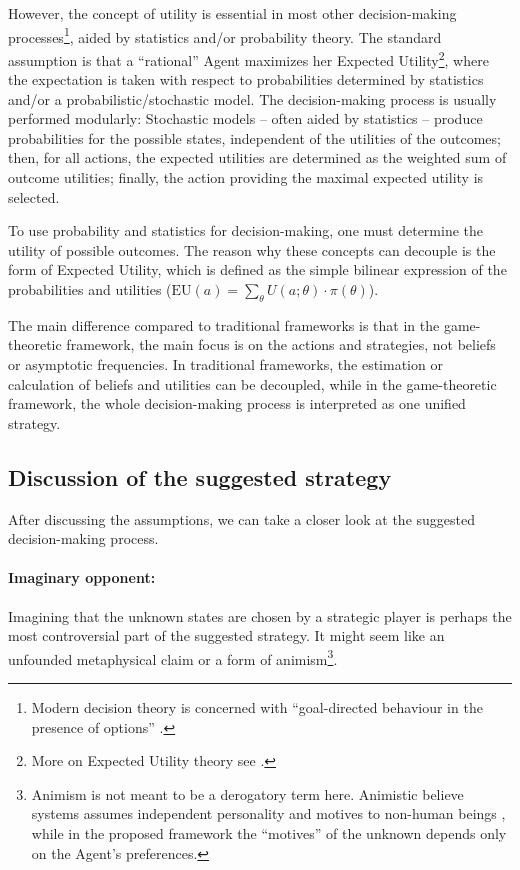 \documentclass{article}
\begin{document}
However, the concept of utility is essential in most other decision-making processes\footnote{Modern decision theory is concerned with ``goal-directed behaviour in the presence of options'' \cite{paper:DecisionTheoryAnOverview}.}, aided by statistics and/or probability theory. The standard assumption is that a ``rational'' Agent maximizes her Expected Utility\footnote{More on Expected Utility theory see \cite{plato:ExpectedUtility}.}, where the expectation is taken with respect to probabilities determined by statistics and/or a probabilistic/stochastic model. The decision-making process is usually performed modularly: Stochastic models – often aided by statistics – produce probabilities for the possible states, independent of the utilities of the outcomes; then, for all actions, the expected utilities are determined as the weighted sum of outcome utilities; finally, the action providing the maximal expected utility is selected.

To use probability and statistics for decision-making, one must determine the utility of possible outcomes. The reason why these concepts can decouple is the form of Expected Utility, which is defined as the simple bilinear expression of the probabilities and utilities ($\mathrm{EU}(a)=\sum_\theta U(a;\theta) \cdot \pi(\theta)$).

The main difference compared to traditional frameworks is that in the game-theoretic framework, the main focus is on the actions and strategies, not beliefs or asymptotic frequencies.
In traditional frameworks, the estimation or calculation of beliefs and utilities can be decoupled, while in the game-theoretic framework, the whole decision-making process is interpreted as one unified strategy.

\subsection*{Discussion of the suggested strategy}

After discussing the assumptions, we can take a closer look at the suggested decision-making process.

\paragraph{Imaginary opponent:}
Imagining that the unknown states are chosen by a strategic player is perhaps the most controversial part of the suggested strategy. It might seem like an unfounded metaphysical claim or a form of animism\footnote{Animism is not meant to be a derogatory term here. Animistic believe systems assumes independent personality and motives to non-human beings \cite{book:Animism}, while in the proposed framework the ``motives'' of the unknown depends only on the Agent's preferences.}. 
\end{document}
